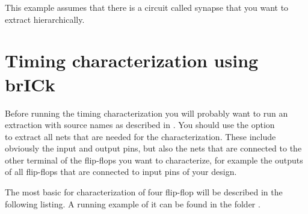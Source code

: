 This example assumes that there is a circuit called synapse that you want to
extract hierarchically.

\section{Timing characterization using brICk}
\label{sec:recipe_characterizer}

Before running the timing characterization you will probably want to run an
extraction with source names as described in \label{sec:calibre_recipes_pex}.
You should use the option\\  to extract all nets that are
needed for the characterization. These include obviously the input and output
pins, but also the nets that are connected to the other terminal of the
flip-flops you want to characterize, for example the outputs of all flip-flops
that are connected to input pins of your design.

The most basic  for characterization of four flip-flop will be described in the following listing. A running example of it can be found in the
folder .

